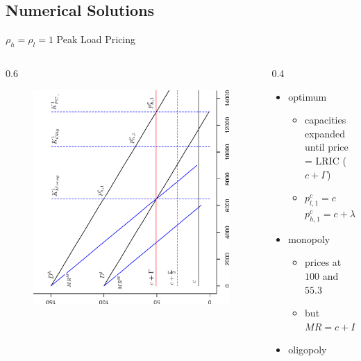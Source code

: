 \subsection{Numerical Solutions}

\begin{frame} {$\rho_h = \rho_l = 1$ Peak Load Pricing}
					
\begin{columns}
\begin{column} {0.6\textwidth}
\begin{figure}[h]
\centering
\includegraphics[width=1.0\textwidth, angle=270]{11}
    \label{fig:1}            
\end{figure}
\end{column}

\begin{column} {0.4\textwidth}

\begin{itemize}
	\item optimum
	
\begin{itemize}
	\item capacities expanded until price = LRIC ($c+ \Gamma$)
	\item $p^c_{l,1} = c$ $p^c_{h,1} = c + \lambda_{i}^{h,1}$
\end{itemize}
  \item monopoly
\begin{itemize}
  \item prices at $100$ and $55.3$
  \item but $MR = c+ \Gamma$
\end{itemize}
  \item oligopoly
  

\end{itemize}
\end{column}
\end{columns}
\end{frame}
